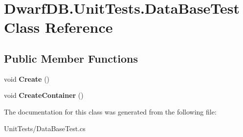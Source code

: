 \hypertarget{class_dwarf_d_b_1_1_unit_tests_1_1_data_base_test}{
\section{DwarfDB.UnitTests.DataBaseTest Class Reference}
\label{class_dwarf_d_b_1_1_unit_tests_1_1_data_base_test}
}
\subsection*{Public Member Functions}
\begin{DoxyCompactItemize}
\item 
\hypertarget{class_dwarf_d_b_1_1_unit_tests_1_1_data_base_test_afa855d00243998793f74f45a8e40a925}{
void {\bfseries Create} ()}
\label{class_dwarf_d_b_1_1_unit_tests_1_1_data_base_test_afa855d00243998793f74f45a8e40a925}

\item 
\hypertarget{class_dwarf_d_b_1_1_unit_tests_1_1_data_base_test_a6bd7caf149d6611d8dca8c1013cc1612}{
void {\bfseries CreateContainer} ()}
\label{class_dwarf_d_b_1_1_unit_tests_1_1_data_base_test_a6bd7caf149d6611d8dca8c1013cc1612}

\end{DoxyCompactItemize}


The documentation for this class was generated from the following file:\begin{DoxyCompactItemize}
\item 
UnitTests/DataBaseTest.cs\end{DoxyCompactItemize}
